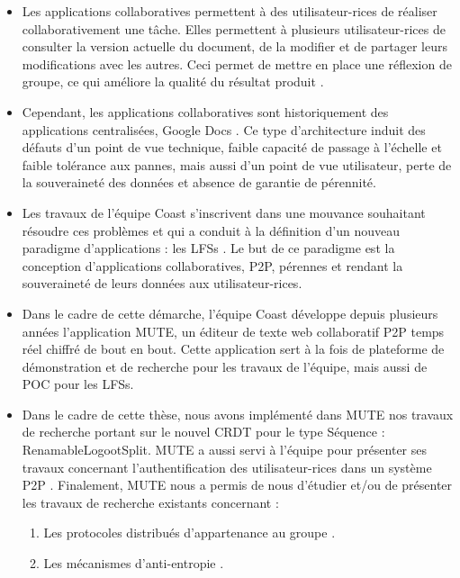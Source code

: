 \begin{itemize}
    \item Les applications collaboratives permettent à des utilisateur-rices de réaliser collaborativement une tâche.
        Elles permettent à plusieurs utilisateur-rices de consulter la version actuelle du document, de la modifier et de partager leurs modifications avec les autres.
        Ceci permet de mettre en place une réflexion de groupe, ce qui améliore la qualité du résultat produit \cite{2004-empirical-study-collaborative-writing,2005-internet-encyclopaedias-head-to-head}.
    \item Cependant, les applications collaboratives sont historiquement des applications centralisées, \eg Google Docs \cite{gdocs}.
        Ce type d'architecture induit des défauts d'un point de vue technique, \eg faible capacité de passage à l'échelle et faible tolérance aux pannes, mais aussi d'un point de vue utilisateur, \eg perte de la souveraineté des données et absence de garantie de pérennité.
    \item Les travaux de l'équipe Coast s'inscrivent dans une mouvance souhaitant résoudre ces problèmes et qui a conduit à la définition d'un nouveau paradigme d'applications : les \acp{LFS} \cite{localfirstsoftware2019}.
        Le but de ce paradigme est la conception d'applications collaboratives, \ac{P2P}, pérennes et rendant la souveraineté de leurs données aux utilisateur-rices.
    \item Dans le cadre de cette démarche, l'équipe Coast développe depuis plusieurs années l'application \acf{MUTE}, un éditeur de texte web collaboratif \ac{P2P} temps réel chiffré de bout en bout.
        Cette application sert à la fois de plateforme de démonstration et de recherche pour les travaux de l'équipe, mais aussi de \ac{POC} pour les \acp{LFS}.
    \item Dans le cadre de cette thèse, nous avons implémenté dans \ac{MUTE} nos travaux de recherche portant sur le nouvel \ac{CRDT} pour le type Séquence : RenamableLogootSplit.
        \ac{MUTE} a aussi servi à l'équipe pour présenter ses travaux concernant l'authentification des utilisateur-rices dans un système \ac{P2P} \cite{2018-trusternity-long}.
        Finalement, \ac{MUTE} nous a permis de nous d'étudier et/ou de présenter les travaux de recherche existants concernant :
        \begin{enumerate}
            \item Les protocoles distribués d'appartenance au groupe \cite{swim2002}.
            \item Les mécanismes d'anti-entropie \cite{1983-anti-entropy-vv}.

\end{enumerate}
\end{itemize}
